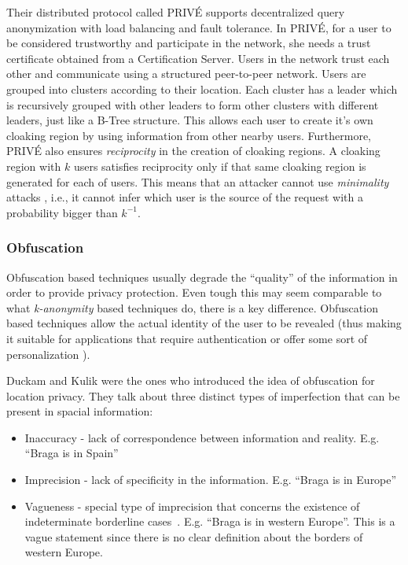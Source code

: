 Their distributed protocol called PRIVÉ supports decentralized query
anonymization with load balancing and fault tolerance. In PRIVÉ, for a
user to be considered trustworthy and participate in the network, she
needs a trust certificate obtained from a Certification Server. Users
in the network trust each other and communicate using a structured
peer-to-peer network. Users are grouped into clusters according to
their location. Each cluster has a leader which is recursively grouped
with other leaders to form other clusters with different leaders, just
like a B-Tree structure. This allows each user to create it's own
cloaking region by using information from other nearby users.
Furthermore, PRIVÉ also ensures \emph{reciprocity} in the creation of
cloaking regions. A cloaking region with $k$ users satisfies
reciprocity only if that same cloaking region is generated for each of
users. This means that an attacker cannot use \emph{minimality} attacks
\cite{wong2007minimality}, i.e., it cannot infer which user is the
source of the request with a probability bigger than $k^{-1}$.

\subsubsection{Obfuscation}
\label{sec:Obfuscation}

Obfuscation based techniques usually degrade the ``quality'' of the
information in order to provide privacy protection. Even tough this may
seem comparable to what \emph{k-anonymity} based techniques do, there is a
key difference. Obfuscation based techniques allow the actual identity
of the user to be revealed (thus making it suitable for applications
that require authentication or offer some sort of  personalization
\cite{langheinrich2001privacy}).

Duckam and Kulik
\cite{duckham2005formal} were the ones who introduced the idea of
obfuscation for location privacy. They talk about three distinct types of
imperfection that can be present in spacial information:
\begin{itemize}
\item Inaccuracy - lack of correspondence between information and
  reality. E.g. ``Braga is in Spain''
\item Imprecision - lack of specificity in the information. E.g.
  ``Braga is in Europe''
\item Vagueness - special type of imprecision that concerns the
  existence of indeterminate borderline
  cases~\cite{duckham2001formal}. E.g. ``Braga is in western Europe''.
  This is a vague statement since there is no clear definition about
  the borders of western Europe.
\end{itemize}

